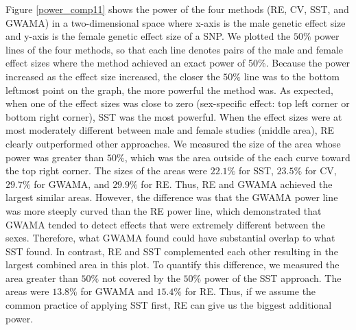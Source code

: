 \documentclass[11pt]{article}
\begin{document}
Figure \ref{power_comp11}
shows the power of the four methods 
(RE, CV, SST, and GWAMA) 
in a two-dimensional space where x-axis is the male genetic effect size and y-axis is 
the female genetic effect size of a SNP.
We plotted the $50\%$ power lines 
of the four methods, so that each line denotes pairs of the male and female effect sizes where the method 
achieved an exact power of 50\%.
Because the power increased as the effect size increased,
the closer the $50\%$ line was to the bottom leftmost point on the graph,
the more powerful the method was.
As expected, when one of the effect sizes was close to zero
(sex-specific effect: top left corner or bottom right corner), 
SST was the most powerful.
When the
effect sizes were at most moderately different between male and female studies (middle area), RE
clearly outperformed other
approaches. 
We measured the size of the area whose power was greater than $50\%$, 
which was the area outside of the each curve toward the top right corner. 
The sizes of the areas were 
$22.1\%$ for SST, $23.5\%$ for CV, $29.7\%$ for GWAMA, and $29.9\%$ for
RE.
Thus, RE and GWAMA achieved the largest similar areas.
However, the difference was that the GWAMA power line was more steeply curved than the RE power line,
which demonstrated that GWAMA tended to detect effects that were extremely different between the sexes.
Therefore, what GWAMA found could have substantial overlap to what SST found. 
In contrast, RE and SST complemented each other resulting in
the largest combined area in this plot.
To quantify this difference, 
we measured the area greater than $50\%$ not 
covered by the $50\%$ power 
of the SST approach. 
The areas were $13.8\%$ for GWAMA and $15.4\%$ for RE.
Thus, if we assume the common practice of applying SST first, %
RE 
can give us the biggest additional power.
\end{document}
